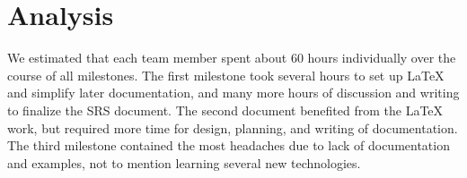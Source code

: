 
\section{Analysis}\label{sec:analysis}
    We estimated that each team member spent about 60 hours individually over the course of all milestones. The first milestone took several hours to set up LaTeX and simplify later documentation, and many more hours of discussion and writing to finalize the SRS document. The second document benefited from the LaTeX work, but required more time for design, planning, and writing of documentation. The third milestone contained the most headaches due to lack of documentation and examples, not to mention learning several new technologies.
